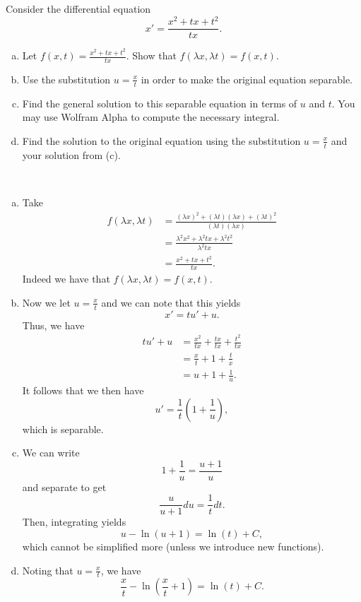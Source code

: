 \documentclass[12pt]{article} %
\begin{document}
\newpage

\begin{problem}
    Consider the differential equation
    \[
    x'=\frac{x^2+tx+t^2}{tx}.
    \]
    \begin{enumerate}[(a)]
        \item Let $f(x,t)=\frac{x^2+tx+t^2}{tx}$.  Show that $f(\lambda x, \lambda t)=f(x,t)$.
        \item Use the substitution $u=\frac{x}{t}$ in order to make the original equation separable.
        \item Find the general solution to this separable equation in terms of $u$ and $t$. You may use Wolfram Alpha to compute the necessary integral.
        \item Find the solution to the original equation using the substitution $u=\frac{x}{t}$ and your solution from (c).
    \end{enumerate}
\end{problem}
\begin{solution}~
\begin{enumerate}[(a)]
    \item Take
    \begin{align*}
        f(\lambda x, \lambda t) &= \frac{(\lambda x)^2 + (\lambda t)(\lambda x) + (\lambda t)^2}{(\lambda t) (\lambda x)}\\
        &= \frac{\lambda^2 x^2 + \lambda^2 tx + \lambda^2 t^2}{\lambda^2 tx}\\
        &= \frac{x^2+tx+t^2}{tx}.
    \end{align*}
    Indeed we have that $f(\lambda x, \lambda t)=f(x,t)$.
    \item Now we let $u=\frac{x}{t}$ and we can note that this yields
    \[
    x' = tu' + u.
    \]
    Thus, we have
    \begin{align*}
        tu'+u &= \frac{x^2}{tx} + \frac{tx}{tx} + \frac{t^2}{tx}\\
        &= \frac{x}{t} + 1 + \frac{t}{x}\\
        &= u + 1 + \frac{1}{u}.
    \end{align*}
    It follows that we then have
    \[
        u' = \frac{1}{t}\left(1+\frac{1}{u}\right),
    \]
    which is separable.
    
\item We can write
\[
1+\frac{1}{u} = \frac{u+1}{u}
\]
and separate to get
\[
\frac{u}{u+1} du = \frac{1}{t}dt.
\]
Then, integrating yields
\[
u-\ln(u+1) = \ln(t) + C,
\]
which cannot be simplified more (unless we introduce new functions).
\item Noting that $u=\frac{x}{t}$, we have
\[
\frac{x}{t} - \ln\left(\frac{x}{t} + 1\right) = \ln(t)+C.
\]
\end{enumerate}
\end{solution}
\end{document}
